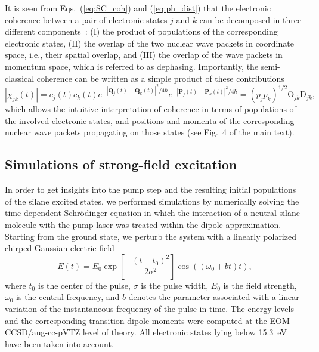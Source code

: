 \documentclass[12pt]{article}
\begin{document}
It is seen from Eqs.~(\ref{eq:SC_coh}) and (\ref{eq:ph_dist}) that the electronic coherence between a pair of electronic states $j$ and $k$ can be decomposed in three different components~\cite{vacher2017}: (I) the product of populations of the corresponding electronic states, (II) the overlap of the two nuclear wave packets in coordinate space, i.e., their spatial overlap, and (III) the overlap of the wave packets in momentum space, which is referred to as dephasing. Importantly, the semi-classical coherence can be written as a simple product of these contributions
%
\begin{equation}
    |\chi_{jk}(t)|=c_j(t) c_k(t)
                 e^{-|\mathbf{Q}_{j}(t)-\mathbf{Q}_{k}(t)|^{2}/4\hbar}
                 e^{-|\mathbf{P}_{j}(t)-\mathbf{P}_{k}(t)|^{2}/4\hbar}=(p_jp_k)^{1/2}
                 \mbox{O}_{jk}\mbox{D}_{jk},
\end{equation}
%
which allows the intuitive interpretation of coherence in terms of populations of the involved electronic states, and positions and momenta of the corresponding nuclear wave packets propagating on those states (see Fig.~4 of the main text).

\subsection{Simulations of strong-field excitation} \label{Sec:SFE}

In order to get insights into the pump step and the resulting initial populations of the silane excited states, we performed simulations by numerically solving the time-dependent Schr\"odinger equation in which the interaction of a neutral silane molecule with the pump laser was treated within the dipole approximation. Starting from the ground state, we perturb the system with a linearly polarized chirped Gaussian electric field
%
\begin{equation}
\label{eq:field}
    E(t)=E_0 \exp{\left[ -\frac{(t-t_{0})^2}{2 \sigma^2} \right]} \cos{((\omega_0+bt) t)},
\end{equation}
%
where $t_0$ is the center of the pulse, $\sigma$ is the pulse width, $E_0$ is the field strength, $\omega_0$ is the central frequency, and $b$ denotes the parameter associated with a linear variation of the instantaneous frequency of the pulse in time. The energy levels and the corresponding transition-dipole moments were computed at the EOM-CCSD/aug-cc-pVTZ level of theory. All electronic states lying below 15.3~eV have been taken into account.
\end{document}
